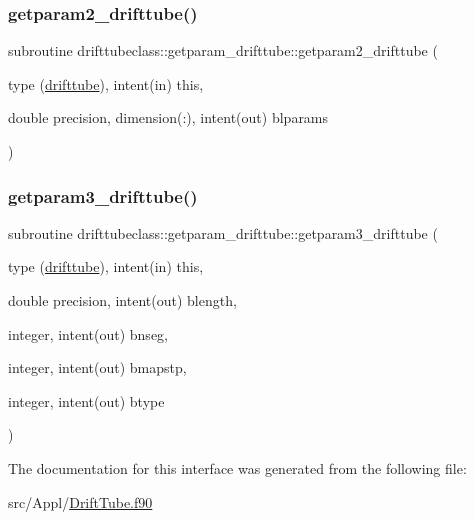 \mbox{\label{interfacedrifttubeclass_1_1getparam__drifttube_ae79a1715b3b9935b7756cb0c0335bc33}} 
\subsubsection{\texorpdfstring{getparam2\_drifttube()}{getparam2\_drifttube()}}
{\footnotesize\ttfamily subroutine drifttubeclass\+::getparam\+\_\+drifttube\+::getparam2\+\_\+drifttube (\begin{DoxyParamCaption}\item[{type (\mbox{\hyperlink{namespacedrifttubeclass_structdrifttubeclass_1_1drifttube}{drifttube}}), intent(in)}]{this,  }\item[{double precision, dimension(\+:), intent(out)}]{blparams }\end{DoxyParamCaption})}

\mbox{\label{interfacedrifttubeclass_1_1getparam__drifttube_a7f0f10f4302e2b8c7d0f539bfbc634ad}} 
\subsubsection{\texorpdfstring{getparam3\_drifttube()}{getparam3\_drifttube()}}
{\footnotesize\ttfamily subroutine drifttubeclass\+::getparam\+\_\+drifttube\+::getparam3\+\_\+drifttube (\begin{DoxyParamCaption}\item[{type (\mbox{\hyperlink{namespacedrifttubeclass_structdrifttubeclass_1_1drifttube}{drifttube}}), intent(in)}]{this,  }\item[{double precision, intent(out)}]{blength,  }\item[{integer, intent(out)}]{bnseg,  }\item[{integer, intent(out)}]{bmapstp,  }\item[{integer, intent(out)}]{btype }\end{DoxyParamCaption})}



The documentation for this interface was generated from the following file\+:\begin{DoxyCompactItemize}
\item 
src/\+Appl/\mbox{\hyperlink{_drift_tube_8f90}{Drift\+Tube.\+f90}}\end{DoxyCompactItemize}
